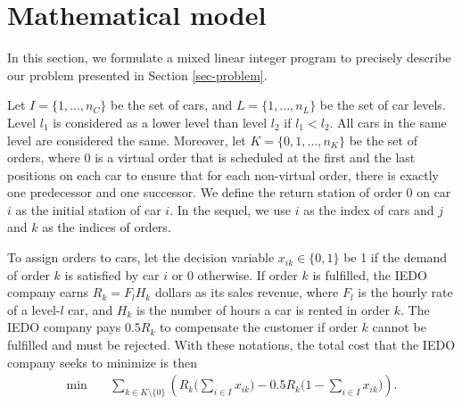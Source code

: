 \documentclass[11pt,a4paper]{article}
\begin{document}
\section{Mathematical model}
\label{sec-model}

In this section, we formulate a mixed linear integer program to precisely describe our problem presented in Section \ref{sec-problem}.

Let $I = \{1, ..., n_C\}$ be the set of cars, and $L = \{1, ..., n_L\}$ be the set of car levels. Level $l_1$ is considered as a lower level than level $l_2$ if $l_1 < l_2$. All cars in the same level are considered the same. Moreover, let $K = \{0, 1, ..., n_K\}$ be the set of orders, where 0 is a virtual order that is scheduled at the first and the last positions on each car to ensure that for each non-virtual order, there is exactly one predecessor and one successor. We define the return station of order 0 on car $i$ as the initial station of car $i$. In the sequel, we use $i$ as the index of cars and $j$ and $k$ as the indices of orders.

To assign orders to cars, let the decision variable $x_{ik} \in \{0, 1\}$ be 1 if the demand of order $k$ is satisfied by car $i$ or 0 otherwise. If order $k$ is fulfilled, the IEDO company earns $R_k = F_l H_k$ dollars as its sales revenue, where $F_l$ is the hourly rate of a level-$l$ car, and $H_k$ is the number of hours a car is rented in order $k$. The IEDO company pays $0.5R_k$ to compensate the customer if order $k$ cannot be fulfilled and must be rejected. With these notations, the total cost that the IEDO company seeks to minimize is then
\begin{align}
    \min \quad & \sum_{k \in K \setminus \{0\}} \left(R_k \Big(\sum_{i \in I} x_{ik}\Big) - 0.5R_k \Big(1 - \sum_{i \in I} x_{ik}\Big)\right) \label{obj-maxRevenue}.
\end{align}
\end{document}
